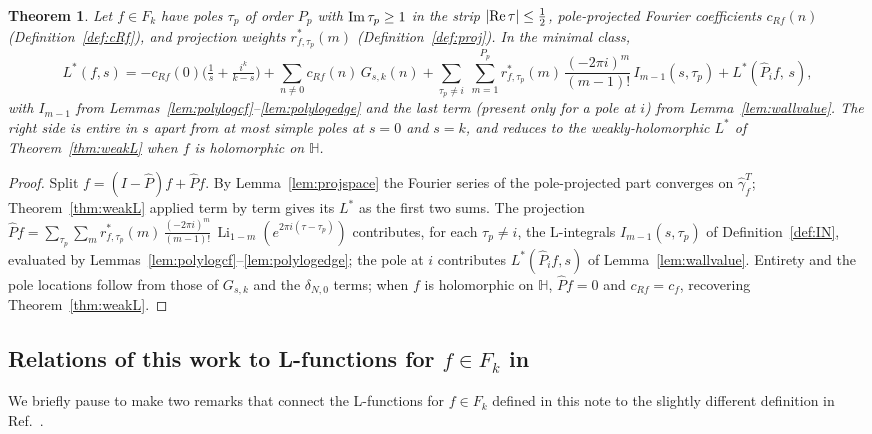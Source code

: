 \documentclass[11pt]{article}
\newtheorem{theorem}{Theorem}[section]
\newcommand{\HH}{\mathbb{H}}
\DeclareMathOperator{\Li}{Li}
\begin{document}
\begin{theorem}\label{thm:mero}
Let $f\in F_k$ have poles $\tau_p$ of order $P_p$ with ${\rm Im}\,\tau_p\ge1$ in the strip
$|{\rm Re}\,\tau|\le\tfrac12$, pole-projected Fourier coefficients $c_{Rf}(n)$
(Definition~\ref{def:cRf}), and projection weights $r^*_{f,\tau_p}(m)$
(Definition~\ref{def:proj}). In the minimal class,
\begin{equation}\label{eq:mero}
L^*(f,s)=-c_{Rf}(0)\Big(\tfrac1s+\tfrac{i^k}{k-s}\Big)
+\sum_{n\ne0}c_{Rf}(n)\,G_{s,k}(n)
+\sum_{\tau_p\ne i}\ \sum_{m=1}^{P_p}r^*_{f,\tau_p}(m)\,\frac{(-2\pi i)^m}{(m-1)!}\,I_{m-1}(s,\tau_p)
+L^*(\widehat P_i f,\,s),
\end{equation}
with $I_{m-1}$ from Lemmas~\ref{lem:polylogcf}--\ref{lem:polylogedge} and the last term
(present only for a pole at $i$) from Lemma~\ref{lem:wallvalue}. The right side is entire in
$s$ apart from at most simple poles at $s=0$ and $s=k$, and reduces to the weakly-holomorphic
$L^*$ of Theorem~\ref{thm:weakL} when $f$ is holomorphic on $\HH$.
\end{theorem}

\begin{proof}
Split $f=(I-\widehat P)f+\widehat Pf$. By Lemma~\ref{lem:projspace} the Fourier series of the
pole-projected part converges on $\hat\gamma_f^T$; Theorem~\ref{thm:weakL} applied term by term
gives its $L^*$ as the first two sums. The projection
$\widehat Pf=\sum_{\tau_p}\sum_m r^*_{f,\tau_p}(m)\,\frac{(-2\pi i)^m}{(m-1)!}\,\Li_{1-m}(e^{2\pi i(\tau-\tau_p)})$
contributes, for each $\tau_p\ne i$, the L-integrals $I_{m-1}(s,\tau_p)$ of
Definition~\ref{def:IN}, evaluated by Lemmas~\ref{lem:polylogcf}--\ref{lem:polylogedge}; the
pole at $i$ contributes $L^*(\widehat P_i f,s)$ of Lemma~\ref{lem:wallvalue}. Entirety and the
pole locations follow from those of $G_{s,k}$ and the $\delta_{N,0}$ terms; when $f$ is
holomorphic on $\HH$, $\widehat Pf=0$ and $c_{Rf}=c_f$, recovering Theorem~\ref{thm:weakL}.
\end{proof}

\subsection{Relations of this work to L-functions for $f \in F_k$ in~\cite{1806}}

We briefly pause to make two remarks that connect the L-functions for $f \in F_k$ defined in this note 
to the slightly different definition in Ref.~\cite{1806}.
\end{document}
